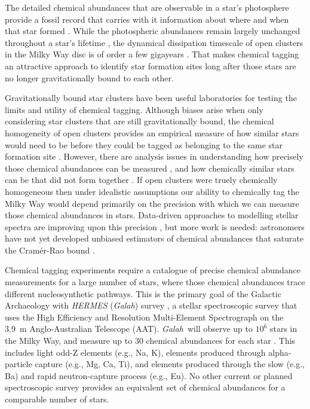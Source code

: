 \documentclass[twocolumn]{aastex62}
\newcommand{\project}[1]{\textsl{#1}}
\newcommand{\Galah}{\project{Galah}}
\begin{document}
The detailed chemical abundances that are observable in a star's photosphere provide a
fossil record that carries with it information about where and when that star
formed \citep{Freeman;Bland-Hawthorn:2002}. While the photospheric abundances remain largely unchanged throughout
a star's lifetime \citep[however see][]{Dotter:2017,Ness:2018b}, the dynamical 
dissipation timescale of open clusters in the Milky Way disc is of order a few 
gigayears \citep{Portegies-Zwart:1998}. That makes chemical tagging an attractive 
approach to identify star formation sites long after those stars are no longer 
gravitationally bound to each other.


Gravitationally bound star clusters have been useful laboratories for
testing the limits and utility of chemical tagging. Although biases arise when
only considering star clusters that are still gravitationally bound, the chemical
homogeneity of open clusters provides an empirical measure of how similar stars
would need to be before they could be tagged as belonging to the same
star formation site \citep{Bland-Hawthorn:2010b,Bland-Hawthorn:2010a,Mitschang:2014}. However, there are analysis
issues in understanding how precisely those chemical abundances can be measured
\citep{Bovy:2016}, and how chemically similar stars can be that did not form 
together \citep[doppleg\"angers;][]{Ness:2018}.
If open clusters were truely chemically homogeneous then under idealistic 
assumptions our ability to chemically tag the Milky Way would depend primarily
on the precision with which we can measure those chemical abundances in stars. 
Data-driven approaches to modelling stellar spectra are
improving upon this precision \citep{Ness:2015,Ness:2018a,Ness:2018b,
Casey:2016,Casey:2017,Ho:2017b,Ho:2017a,Leung;Bovy:2018}, but more work is
needed: astronomers have not yet developed unbiased estimators of chemical
abundances that saturate the Cram\'er-Rao bound \citep{Cramer:1946,Rao:1945}.


Chemical tagging experiments require a catalogue of precise chemical abundance
measurements for a large number of stars,
where those chemical abundances trace different nucleosynthetic pathways.
This is the primary goal of the Galactic Archaeology with \project{HERMES} (\Galah) survey \citep{DeSilva:2015,Martell:2017,Buder:2018},
a stellar spectroscopic survey that uses the High Efficiency and Resolution 
Multi-Element Spectrograph \citep[\project{HERMES};][]{Sheinis:2015} on the 3.9~m Anglo-Australian 
Telescope (AAT).  \Galah\ will observe up to $10^6$ stars in the 
Milky Way, and measure up to 30 chemical abundances for each star \citep{Bland-Hawthorn:2016}. This includes
light odd-Z elements (e.g., Na, K), elements produced through
alpha-particle capture (e.g., Mg, Ca, Ti), and elements produced
through the slow (e.g., Ba) and rapid neutron-capture process
(e.g., Eu). No other current or planned spectroscopic survey provides an equivalent set of
chemical abundances for a comparable number of stars.
\end{document}
